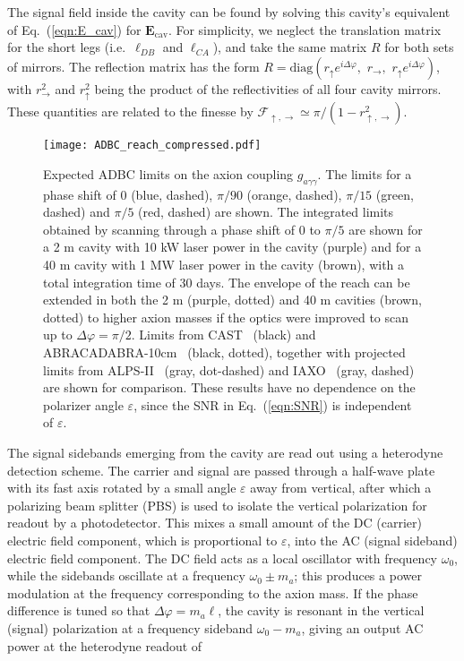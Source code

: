 \documentclass[aps,prd,nofootinbib,twocolumn,superscriptaddress,preprintnumbers,letterpaper, longbibliography]{revtex4-1}
\def\rc{r_\rightarrow}
\def\rs{r_\uparrow}
\begin{document}
The signal field inside the cavity can be found by solving this cavity's equivalent of Eq.~(\ref{eqn:E_cav}) for $\mathbf{E}_\text{cav}$. For simplicity, we neglect the translation matrix for the short legs (i.e.\ $\ell_{DB}$ and $\ell_{CA}$), and take the same matrix $R$ for both sets of mirrors.
The reflection matrix has the form $R = \text{diag} (\rs e^{i \Delta \varphi}, \, \, \rc,  \,\, \rs e^{i \Delta \varphi})$, with $\rc^2$ and $\rs^2$ being the product of the reflectivities of all four cavity mirrors. These quantities are related to the finesse by $\mathcal{F}_{\uparrow, \rightarrow} \simeq \pi/(1 - r_{\uparrow,\rightarrow}^2)$.

\begin{figure}
    \centering
    \texttt{[image: ADBC\_reach\_compressed.pdf]}\caption{
    Expected ADBC limits on the axion coupling $g_{a\gamma\gamma}$. The limits for a phase shift of 0 (blue, dashed), $\pi/90$ (orange, dashed), $\pi/15$ (green, dashed) and $\pi/5$ (red, dashed) are shown. The integrated limits obtained by scanning through a phase shift of 0 to $\pi/5$ are shown for a 2 m cavity with 10 kW laser power in the cavity (purple) and for a 40 m cavity with 1 MW laser power in the cavity (brown), with a total integration time of 30 days. The envelope of the reach can be extended in both the 2 m (purple, dotted) and 40 m cavities (brown, dotted) to higher axion masses if the optics were improved to scan up to $\Delta \varphi = \pi/2$. Limits from CAST~\cite{Anastassopoulos:2017ftl} (black) and ABRACADABRA-10cm~\cite{Ouellet:2018beu} (black, dotted), together with projected limits from ALPS-II~\cite{Bahre:2013ywa} (gray, dot-dashed) and IAXO~\cite{Irastorza:1567109} (gray, dashed) are shown for comparison. These results have no dependence on the polarizer angle $\varepsilon$, since the SNR in Eq.~(\ref{eqn:SNR}) is independent of $\varepsilon$.}
    \label{fig:ADBC_reach}
\end{figure}
% 
The signal sidebands emerging from the cavity are read out using a heterodyne detection scheme. The carrier and signal are passed through a half-wave plate with its fast axis rotated by a small angle $\varepsilon$ away from vertical, after which a polarizing beam splitter (PBS) is used to isolate the vertical polarization for readout by a photodetector. This mixes a small amount of the DC (carrier) electric field component, which is proportional to $\varepsilon$, into the AC (signal sideband) electric field component. The DC field acts as a local oscillator with frequency $\omega_0$, while the sidebands oscillate at a frequency $\omega_0 \pm m_a$; this produces a power modulation at the frequency corresponding to the axion mass. If the phase difference is tuned so that $\Delta \varphi = m_a \ell$, the cavity is resonant in the vertical (signal) polarization at a frequency sideband $\omega_0 - m_a$, giving an output AC power at the heterodyne readout of
\end{document}
